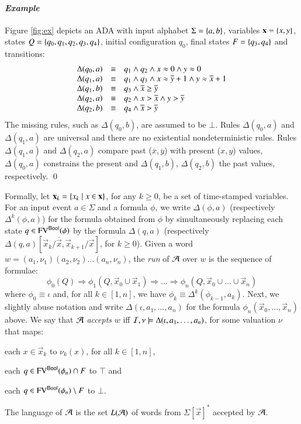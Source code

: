 \documentclass[10pt,conference,letterpaper,twocolumn]{IEEEtran}
\begin{document}
\paragraph{\em Example}
Figure \ref{fig:ex} depicts an ADA with input alphabet $\Sigma =
\left\{ a,b \right\}$, variables $\mathbf x = \left\{ x,y \right\}$, states $Q =
\left\{ q_0,q_1,q_2,q_3,q_4 \right\}$, initial configuration $q_0$, final states
$F=\left\{ q_3,q_4 \right\}$ and transitions:
\[\begin{array}{rcl}
\Delta(q_0,a) & \equiv & q_1 \wedge q_2 \wedge x\approx0 \wedge y\approx0 \\
\Delta(q_1,a) & \equiv & q_1 \wedge q_3 \wedge x\approx\overline{y}+1 \wedge y\approx\overline{x}+1 \\
\Delta(q_1,b) & \equiv & q_3 \wedge \overline{x} \geq \overline{y} \\
\Delta(q_2,a) & \equiv & q_2 \wedge x > \overline{x} \wedge y > \overline{y} \\
\Delta(q_2,b) & \equiv & q_4 \wedge \overline{x}>\overline{y}
\end{array}\]
The missing rules, such as $\Delta(q_0,b)$, are assumed to be
$\bot$. Rules $\Delta(q_0,a)$ and $\Delta(q_1,a)$ are universal and
there are no existential nondeterministic rules. Rules $\Delta(q_1,a)$
and $\Delta(q_2,a)$ compare past ($\overline{x},\overline{y}$) with
present ($x,y$) values, $\Delta(q_0,a)$ constrains the present and
$\Delta(q_1,b)$, $\Delta(q_2,b)$ the past values, respectively. \qed

Formally, let $\mathbf x_k = \left\{ x_k \mid x \in \mathbf x \right\}$, for any
$k\geq0$, be a set of time-stamped variables. For an input event $a
\in \Sigma$ and a formula $\phi$, we write $\Delta(\phi,a)$
(respectively $\Delta^k(\phi,a)$) for the formula obtained from $\phi$
by simultaneously replacing each state $q \in \mathrm{FV}^{\mathsf{Bool}}(\phi)$ by the
formula $\Delta(q,a)$ (respectively
$\Delta(q,a)[\vec{x}_k/\overline{\vec{x}},\vec{x}_{k+1}/\vec{x}]$, for
$k\geq0$). Given a word $w = (a_1,\nu_1)(a_2,\nu_2) \ldots
(a_n,\nu_n)$, the \emph{run} of $\mathcal{A}$ over $w$ is the sequence of
formulae: \[\phi_0(Q) \Rightarrow \phi_1(Q,\vec{x}_0 \cup \vec{x}_1)
\Rightarrow \ldots \Rightarrow \phi_n(Q,\vec{x}_0 \cup \ldots \cup
\vec{x}_n)\] where $\phi_0 \equiv \iota$ and, for all $k\in[1,n]$, we
have $\phi_k \equiv \Delta^k(\phi_{k-1},a_k)$. Next, we slightly abuse
notation and write $\Delta(\iota,a_1,\ldots,a_n)$ for the formula
$\phi_n(\vec{x}_0,\ldots,\vec{x}_n)$ above. We say that $\mathcal{A}$
\emph{accepts} $w$ iff $\mathcal{I},\nu \models \Delta(\iota,a_1,\ldots,a_n)$,
for some valuation $\nu$ that maps:\begin{inparaenum}[(1)]
%
\item each $x \in \vec{x}_k$ to $\nu_k(x)$, for all $k\in[1,n]$, 
%
\item each $q \in \mathrm{FV}^{\mathsf{Bool}}(\phi_n) \cap F$ to $\top$ and 
%
\item each $q \in \mathrm{FV}^{\mathsf{Bool}}(\phi_n) \setminus F$ to $\bot$.
\end{inparaenum}
The language of $\mathcal{A}$ is the set $L(\mathcal{A})$ of words from
$\Sigma[\vec{x}]^*$ accepted by $\mathcal{A}$.
\end{document}
